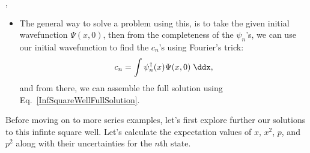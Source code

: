 \sep

\begin{itemize}
    \item The general way to solve a problem using this, is to take the given initial wavefunction $\Psi(x,0)$, then from the completeness of the $\psi_n$'s, we can use our initial wavefunction to find the $c_n$'s using Fourier's trick:
        \begin{equation}
            c_n = \int \psi_n^{\dagger}(x) \Psi(x,0) \;\ddx,\label{InfSquareWellStartingPoint}
        \end{equation}
        and from there, we can assemble the full solution using Eq.~\eqref{InfSquareWellFullSolution}.
\end{itemize}

\begin{example}
    Before moving on to more series examples, let's first explore further our solutions to this infinte square well. Let's calculate the expectation values of $x$, $x^2$, $p$, and $p^2$ along with their uncertainties for the $n$th state.


\end{example}
